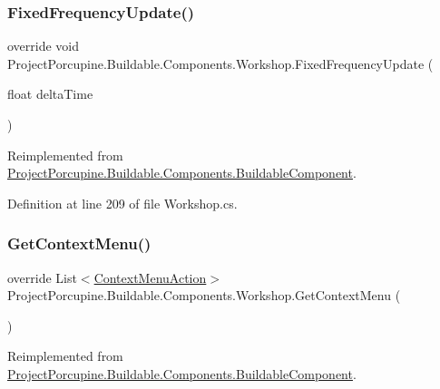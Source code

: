 \subsubsection{\texorpdfstring{Fixed\+Frequency\+Update()}{FixedFrequencyUpdate()}}
{\footnotesize\ttfamily override void Project\+Porcupine.\+Buildable.\+Components.\+Workshop.\+Fixed\+Frequency\+Update (\begin{DoxyParamCaption}\item[{float}]{delta\+Time }\end{DoxyParamCaption})\hspace{0.3cm}{\ttfamily [virtual]}}



Reimplemented from \hyperlink{class_project_porcupine_1_1_buildable_1_1_components_1_1_buildable_component_a0528e50f3dbe24481256802e758deeb9}{Project\+Porcupine.\+Buildable.\+Components.\+Buildable\+Component}.



Definition at line 209 of file Workshop.\+cs.

\mbox{\label{class_project_porcupine_1_1_buildable_1_1_components_1_1_workshop_a08da90f814b602c3de05862fdc33dd03}} 
\subsubsection{\texorpdfstring{Get\+Context\+Menu()}{GetContextMenu()}}
{\footnotesize\ttfamily override List$<$\hyperlink{class_context_menu_action}{Context\+Menu\+Action}$>$ Project\+Porcupine.\+Buildable.\+Components.\+Workshop.\+Get\+Context\+Menu (\begin{DoxyParamCaption}{ }\end{DoxyParamCaption})\hspace{0.3cm}{\ttfamily [virtual]}}



Reimplemented from \hyperlink{class_project_porcupine_1_1_buildable_1_1_components_1_1_buildable_component_aeab2f8844d0c51fbaceffc733b3eb74f}{Project\+Porcupine.\+Buildable.\+Components.\+Buildable\+Component}.



